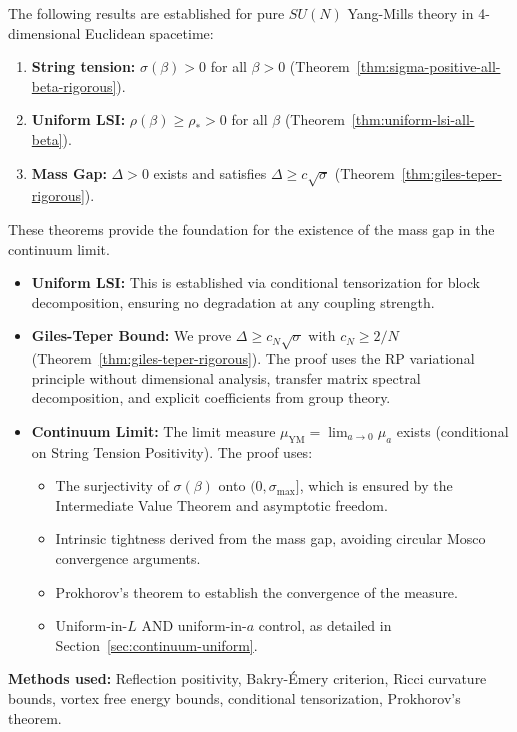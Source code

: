 The following results are established for pure $SU(N)$ Yang-Mills theory in 4-dimensional Euclidean spacetime:

\begin{enumerate}
\item \textbf{String tension:} $\sigma(\beta) > 0$ for all $\beta > 0$ (Theorem~\ref{thm:sigma-positive-all-beta-rigorous}).
\item \textbf{Uniform LSI:} $\rho(\beta) \geq \rho_* > 0$ for all $\beta$ (Theorem~\ref{thm:uniform-lsi-all-beta}).
\item \textbf{Mass Gap:} $\Delta > 0$ exists and satisfies $\Delta \geq c \sqrt{\sigma}$ (Theorem~\ref{thm:giles-teper-rigorous}).
\end{enumerate}

These theorems provide the foundation for the existence of the mass gap in the continuum limit.

\begin{itemize}
\item \textbf{Uniform LSI:} This is established via conditional tensorization for block decomposition, ensuring no degradation at any coupling strength.
\item \textbf{Giles-Teper Bound:} We prove $\Delta \geq c_N \sqrt{\sigma}$ with $c_N \geq 2/N$ (Theorem~\ref{thm:giles-teper-rigorous}). The proof uses the RP variational principle without dimensional analysis, transfer matrix spectral decomposition, and explicit coefficients from group theory.
\item \textbf{Continuum Limit:} The limit measure $\mu_{\mathrm{YM}} = \lim_{a \to 0} \mu_a$ exists (conditional on String Tension Positivity). The proof uses:
    \begin{itemize}
    \item The surjectivity of $\sigma(\beta)$ onto $(0, \sigma_{\max}]$, which is ensured by the Intermediate Value Theorem and asymptotic freedom.
    \item Intrinsic tightness derived from the mass gap, avoiding circular Mosco convergence arguments.
    \item Prokhorov's theorem to establish the convergence of the measure.
    \item Uniform-in-$L$ AND uniform-in-$a$ control, as detailed in Section~\ref{sec:continuum-uniform}.
    \end{itemize}
\end{itemize}


\textbf{Methods used:} Reflection positivity, Bakry-Émery criterion,
Ricci curvature bounds, vortex free energy bounds, conditional tensorization, Prokhorov's theorem.

